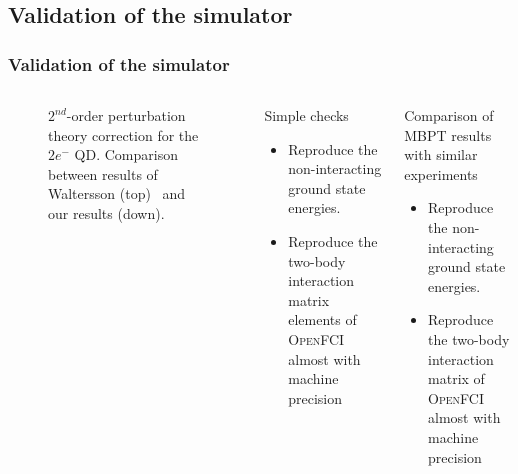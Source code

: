 \documentclass[xcolor=pdftex,hyperref={pdfpagelabels=false},table]{beamer}
\begin{document}
\subsection{Validation of the simulator}
\begin{frame}
\frametitle{Validation of the simulator}
\begin{scriptsize}
\begin{columns}[T,l]
\column{5cm}%
\begin{figure}
\begin{center}
	\vspace{-5pt}
	\caption{$2^{nd}$-order perturbation theory correction for the $2e^-$ QD. Comparison between results of Waltersson (top)~\cite{Waltersson2007} and our results (down).}
	\vspace{-5pt}
\end{center}
\end{figure}
\column{6cm}
\begin{block}{Simple checks}
 \begin{itemize}
\item  Reproduce the non-interacting ground state energies.
\item  Reproduce the two-body interaction matrix elements of \textsc{OpenFCI} almost with machine precision
\end{itemize}
\end{block}
\begin{block}{Comparison of MBPT results with similar experiments}
 \begin{itemize}
\item  Reproduce the non-interacting ground state energies.
\item  Reproduce the two-body interaction matrix of \textsc{OpenFCI} almost with machine precision
\end{itemize}
\end{block}
\end{columns}
\end{scriptsize}
\end{frame}
 
\end{document}

